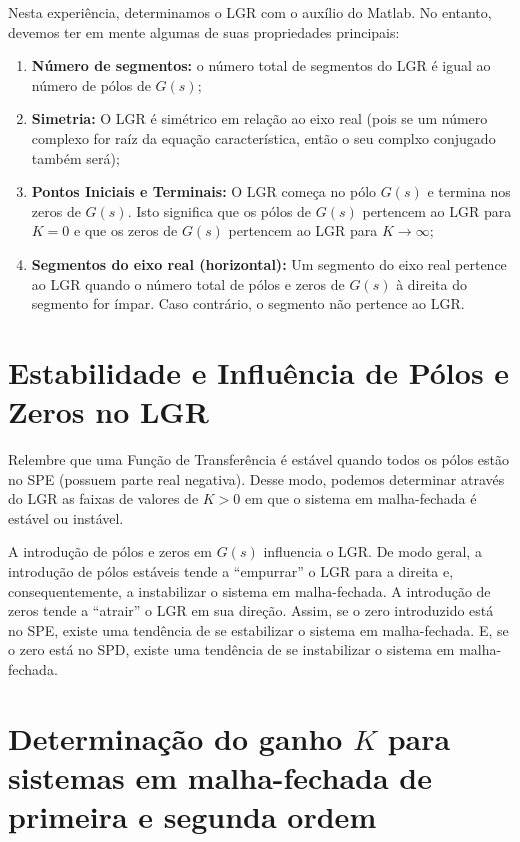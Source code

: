 \documentclass[
]{book}
\providecommand{\tightlist}{%
  \setlength{\itemsep}{0pt}\setlength{\parskip}{0pt}}
\theoremstyle{definition}
\theoremstyle{definition}
\theoremstyle{definition}
\theoremstyle{remark}
\begin{document}
Nesta experiência, determinamos o LGR com o auxílio do Matlab. No entanto, devemos ter em mente algumas de suas propriedades principais:

\begin{enumerate}
\def\labelenumi{\arabic{enumi}.}
\tightlist
\item
  \textbf{Número de segmentos:} o número total de segmentos do LGR é igual ao número de pólos de \(G(s)\);
\item
  \textbf{Simetria:} O LGR é simétrico em relação ao eixo real (pois se um número complexo for raíz da equação característica, então o seu complxo conjugado também será);
\item
  \textbf{Pontos Iniciais e Terminais:} O LGR começa no pólo \(G(s)\) e termina nos zeros de \(G(s)\). Isto significa que os pólos de \(G(s)\) pertencem ao LGR para \(K=0\) e que os zeros de \(G(s)\) pertencem ao LGR para \(K\to\infty\);
\item
  \textbf{Segmentos do eixo real (horizontal):} Um segmento do eixo real pertence ao LGR quando o número total de pólos e zeros de \(G(s)\) à direita do segmento for ímpar. Caso contrário, o segmento não pertence ao LGR.
\end{enumerate}

\hypertarget{estabilidade-e-influuxeancia-de-puxf3los-e-zeros-no-lgr}{%
\section{Estabilidade e Influência de Pólos e Zeros no LGR}\label{estabilidade-e-influuxeancia-de-puxf3los-e-zeros-no-lgr}}

Relembre que uma Função de Transferência é estável quando todos os pólos estão no SPE (possuem parte real negativa). Desse modo, podemos determinar através do LGR as faixas de valores de \(K>0\) em que o sistema em malha-fechada é estável ou instável.

A introdução de pólos e zeros em \(G(s)\) influencia o LGR. De modo geral, a introdução de pólos estáveis tende a ``empurrar'' o LGR para a direita e, consequentemente, a instabilizar o sistema em malha-fechada. A introdução de zeros tende a ``atrair'' o LGR em sua direção. Assim, se o zero introduzido está no SPE, existe uma tendência de se estabilizar o sistema em malha-fechada. E, se o zero está no SPD, existe uma tendência de se instabilizar o sistema em malha-fechada.

\hypertarget{determinauxe7uxe3o-do-ganho-k-para-sistemas-em-malha-fechada-de-primeira-e-segunda-ordem}{%
\section{\texorpdfstring{Determinação do ganho \(K\) para sistemas em malha-fechada de primeira e segunda ordem}{Determinação do ganho K para sistemas em malha-fechada de primeira e segunda ordem}}\label{determinauxe7uxe3o-do-ganho-k-para-sistemas-em-malha-fechada-de-primeira-e-segunda-ordem}}
\end{document}

